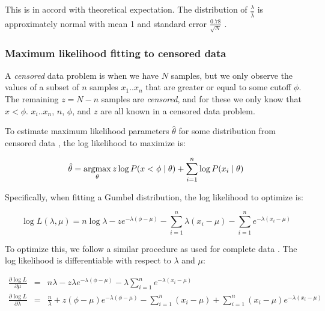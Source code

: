 This is in accord with theoretical expectation. The distribution of
$\frac{\lambda}{\hat{\lambda}}$ is approximately normal with mean 1 and
standard error $\frac{0.78}{\sqrt{N}}$ \citep{Lawless82,Altschul01}. 



\subsubsection{Maximum likelihood fitting to censored data}

A \emph{censored} data problem is when we have $N$ samples, but we
only observe the values of a subset of $n$ samples $x_1..x_n$ that are
greater or equal to some cutoff $\phi$. The remaining $z = N-n$
samples are \emph{censored}, and for these we only know that $x <
\phi$.  $x_i..x_n$, $n$, $\phi$, and $z$ are all known in a censored
data problem.

To estimate maximum likelihood parameters $\hat{\theta}$ for some
distribution from censored data \citep{Gelman95}, the log likelihood
to maximize is:


\[ 
  \hat{\theta} = \mathop{\mathrm{argmax}}\limits_{\theta} z \log P(x<\phi \mid \theta)
                         + \sum_{i=1}^n \log P(x_i \mid \theta)
\]

Specifically, when fitting a Gumbel distribution, the log likelihood
to optimize is:

\begin{equation}
  \log L(\lambda, \mu) = 
    n \log \lambda 
     - z e^{-\lambda(\phi - \mu)}
     - \sum_{i=1}^{n} \lambda(x_i - \mu) 
     - \sum_{i=1}^{n} e^{-\lambda(x_i - \mu)}
\label{eqn:censor_logL}
\end{equation}

To optimize this, we follow a similar procedure as used for complete
data \citep{Lawless82}. The log likelihood is differentiable with
respect to $\lambda$ and $\mu$:

\begin{eqnarray}
\frac{\partial \log L}{\partial \mu} & = &
n \lambda  
- z \lambda e^{-\lambda (\phi - \mu)}
- \lambda \sum_{i=1}^{n} e^{-\lambda (x_i - \mu)}
\label{eqn:censor_dmu}
\\%
\frac{\partial \log L}{\partial \lambda} & = &
\frac{n}{\lambda} 
+ z (\phi - \mu) e^{-\lambda (\phi - \mu)}
- \sum_{i=1}^{n} (x_i - \mu) 
+ \sum_{i=1}^{n} (x_i - \mu) e^{-\lambda (x_i - \mu)}
\label{eqn:censor_dlambda}
\end{eqnarray}

